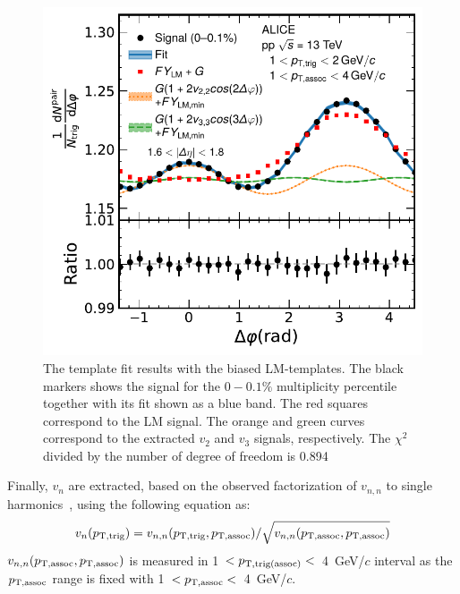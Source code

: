 \begin{figure}[h!]
	\centering
	\includegraphics[width=0.6 \textwidth]{figures/Fig1_FlowExt.pdf} 
	\caption{The template fit results with the biased LM-templates. The black markers shows the signal for the $0-0.1\%$ multiplicity percentile together with its fit shown as a blue band. The red squares correspond to the LM signal. The orange and green curves correspond to the extracted $v_2$ and $v_3$ signals, respectively. The $\chi^{2}$ divided by the number of degree of freedom is 0.894}
	\label{fig:flowext}
\end{figure}

Finally, $v_{n}$ are extracted, based on the observed factorization of $v_{n,n}$ to single harmonics~\cite{ATLAS:2015hzw,ATLAS:2016yzd}, using the following equation as:
\begin{eqnarray}
v_{n}(p_{\rm{T,trig}}) = v_{n,n}(p_{\rm{T,trig}}, p_{\rm{T,assoc}}) / \sqrt{ v_{n,n}(p_{\rm{T,assoc}},p_{\rm{T,assoc}})}
\end{eqnarray}
$v_{n,n}(p_{\rm{T,assoc}},p_{\rm{T,assoc}})$ is measured in 1~$<p_{\rm{T,trig(assoc)}}<$~4~GeV/$c$ interval as the $p_{\rm{T,assoc}}$ range is fixed with 1~$<p_{\rm{T,assoc}}<$~4~GeV/$c$.

